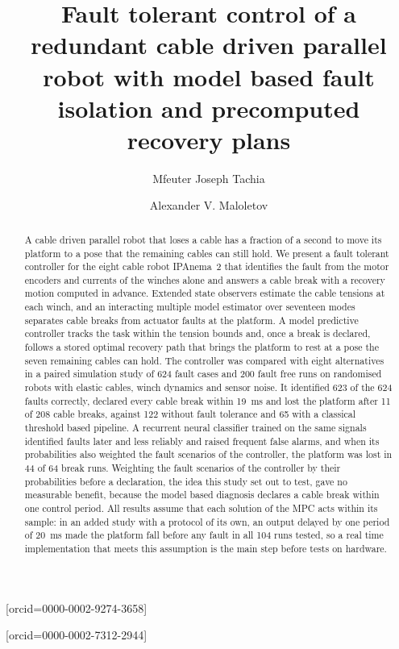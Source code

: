 \documentclass[a4paper,fleqn]{cas-dc}
\begin{document}
\let\WriteBookmarks\relax
\def\floatpagepagefraction{1}
\def\textpagefraction{.001}


\title[mode=title]{Fault tolerant control of a redundant cable driven parallel robot with model based fault isolation and precomputed recovery plans}

\author[1]{Mfeuter Joseph Tachia}[orcid=0000-0002-9274-3658]
\cormark[1]
\author[1,2]{Alexander V. Maloletov}[orcid=0000-0002-7312-2944]

\begin{abstract}
A cable driven parallel robot that loses a cable has a fraction of a second to move its platform to a pose that the remaining cables can still hold. We present a fault tolerant controller for the eight cable robot IPAnema~2 that identifies the fault from the motor encoders and currents of the winches alone and answers a cable break with a recovery motion computed in advance. Extended state observers estimate the cable tensions at each winch, and an interacting multiple model estimator over seventeen modes separates cable breaks from actuator faults at the platform. A model predictive controller tracks the task within the tension bounds and, once a break is declared, follows a stored optimal recovery path that brings the platform to rest at a pose the seven remaining cables can hold. The controller was compared with eight alternatives in a paired simulation study of 624 fault cases and 200 fault free runs on randomised robots with elastic cables, winch dynamics and sensor noise. It identified 623 of the 624 faults correctly, declared every cable break within 19~ms and lost the platform after 11 of 208 cable breaks, against 122 without fault tolerance and 65 with a classical threshold based pipeline. A recurrent neural classifier trained on the same signals identified faults later and less reliably and raised frequent false alarms, and when its probabilities also weighted the fault scenarios of the controller, the platform was lost in 44 of 64 break runs. Weighting the fault scenarios of the controller by their probabilities before a declaration, the idea this study set out to test, gave no measurable benefit, because the model based diagnosis declares a cable break within one control period. All results assume that each solution of the MPC acts within its sample: in an added study with a protocol of its own, an output delayed by one period of 20~ms made the platform fall before any fault in all 104 runs tested, so a real time implementation that meets this assumption is the main step before tests on hardware.
\end{abstract}
\end{document}
